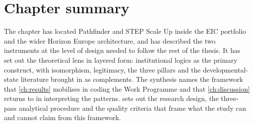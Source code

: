 \section{Chapter summary}
\label{sec:bg-summary}

The chapter has located Pathfinder and STEP Scale Up inside the EIC
portfolio and the wider Horizon Europe architecture, and has described
the two instruments at the level of design needed to follow the rest
of the thesis. It has set out the theoretical lens in layered form:
institutional logics as the primary construct, with isomorphism,
legitimacy, the three pillars and the developmental-state literature
brought in as complements. The synthesis names the framework that
\cref{ch:results} mobilises in coding the Work Programme and that
\cref{ch:discussion} returns to in interpreting the patterns.
 sets out the research design, the three-pass
analytical procedure and the quality criteria that frame what the
study can and cannot claim from this framework.
